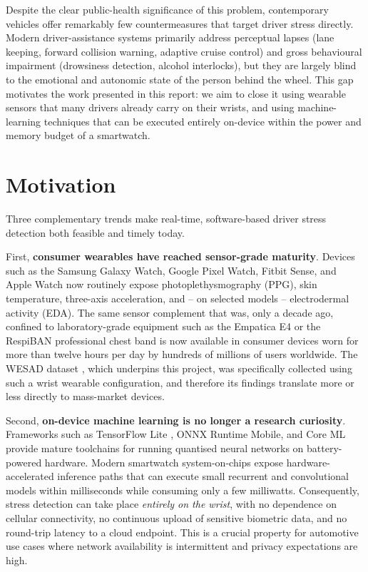 Despite the clear public-health significance of this problem,
contemporary vehicles offer remarkably few countermeasures that
target driver stress directly. Modern driver-assistance systems
primarily address perceptual lapses (lane keeping, forward collision
warning, adaptive cruise control) and gross behavioural impairment
(drowsiness detection, alcohol interlocks), but they are largely blind
to the emotional and autonomic state of the person behind the wheel.
This gap motivates the work presented in this report: we aim to close
it using wearable sensors that many drivers already carry on their
wrists, and using machine-learning techniques that can be executed
entirely on-device within the power and memory budget of a smartwatch.

\section{Motivation}
\label{sec:motivation}

Three complementary trends make real-time, software-based driver
stress detection both feasible and timely today.

First, \textbf{consumer wearables have reached sensor-grade maturity}.
Devices such as the Samsung Galaxy Watch, Google Pixel Watch, Fitbit
Sense, and Apple Watch now routinely expose photoplethysmography (PPG),
skin temperature, three-axis acceleration, and -- on selected models --
electrodermal activity (EDA). The same sensor complement that was, only
a decade ago, confined to laboratory-grade equipment such as the Empatica
E4 or the RespiBAN professional chest band is now available in consumer
devices worn for more than twelve hours per day by hundreds of millions
of users worldwide. The WESAD dataset \citep{schmidt2018wesad}, which
underpins this project, was specifically collected using such a wrist
wearable configuration, and therefore its findings translate more or
less directly to mass-market devices.

Second, \textbf{on-device machine learning is no longer a research
curiosity}. Frameworks such as TensorFlow Lite \citep{tflite2023},
ONNX Runtime Mobile, and Core ML provide mature toolchains for running
quantised neural networks on battery-powered hardware. Modern smartwatch
system-on-chips expose hardware-accelerated inference paths that can
execute small recurrent and convolutional models within milliseconds
while consuming only a few milliwatts. Consequently, stress detection
can take place \emph{entirely on the wrist}, with no dependence on
cellular connectivity, no continuous upload of sensitive biometric
data, and no round-trip latency to a cloud endpoint. This is a crucial
property for automotive use cases where network availability is
intermittent and privacy expectations are high.

